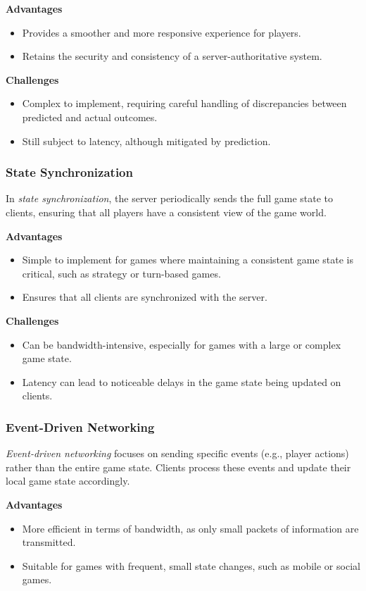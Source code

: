 \documentclass{article} %
\begin{document}
\textbf{Advantages}
\begin{itemize}
	\item Provides a smoother and more responsive experience for players.
	\item Retains the security and consistency of a server-authoritative system.
\end{itemize}

\textbf{Challenges}
\begin{itemize}
	\item Complex to implement, requiring careful handling of discrepancies between predicted and actual outcomes.
	\item Still subject to latency, although mitigated by prediction.
\end{itemize}

\subsubsection{State Synchronization}
In \textit{state synchronization}, the server periodically sends the full game state to clients, ensuring that all players have a consistent view of the game world.

\textbf{Advantages}
\begin{itemize}
	\item Simple to implement for games where maintaining a consistent game state is critical, such as strategy or turn-based games.
	\item Ensures that all clients are synchronized with the server.
\end{itemize}

\textbf{Challenges}
\begin{itemize}
	\item Can be bandwidth-intensive, especially for games with a large or complex game state.
	\item Latency can lead to noticeable delays in the game state being updated on clients.
\end{itemize}

\subsubsection{Event-Driven Networking}
\textit{Event-driven networking} focuses on sending specific events (e.g., player actions) rather than the entire game state. Clients process these events and update their local game state accordingly.

\textbf{Advantages}
\begin{itemize}
	\item More efficient in terms of bandwidth, as only small packets of information are transmitted.
	\item Suitable for games with frequent, small state changes, such as mobile or social games.
\end{itemize}
\end{document}
